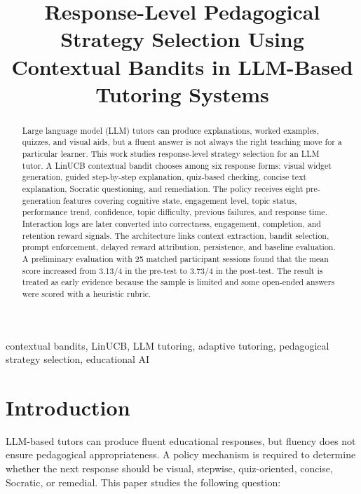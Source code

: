 \documentclass[conference]{IEEEtran}
\begin{document}
\title{Response-Level Pedagogical Strategy Selection Using
Contextual Bandits in LLM-Based Tutoring Systems}

\author{}

\maketitle

\begin{abstract}
Large language model (LLM) tutors can produce explanations, worked examples, quizzes, and visual aids, but a fluent answer is not always the right teaching move for a particular learner. This work studies response-level strategy selection for an LLM tutor. A LinUCB contextual bandit chooses among six response forms: visual widget generation, guided step-by-step explanation, quiz-based checking, concise text explanation, Socratic questioning, and remediation. The policy receives eight pre-generation features covering cognitive state, engagement level, topic status, performance trend, confidence, topic difficulty, previous failures, and response time. Interaction logs are later converted into correctness, engagement, completion, and retention reward signals. The architecture links context extraction, bandit selection, prompt enforcement, delayed reward attribution, persistence, and baseline evaluation. A preliminary evaluation with 25 matched participant sessions found that the mean score increased from 3.13/4 in the pre-test to 3.73/4 in the post-test. The result is treated as early evidence because the sample is limited and some open-ended answers were scored with a heuristic rubric.
\end{abstract}

\begin{IEEEkeywords}
contextual bandits, LinUCB, LLM tutoring, adaptive tutoring, pedagogical strategy selection, educational AI
\end{IEEEkeywords}

\section{Introduction}

LLM-based tutors can produce fluent educational responses, but fluency does not ensure pedagogical appropriateness. A policy mechanism is required to determine whether the next response should be visual, stepwise, quiz-oriented, concise, Socratic, or remedial. This paper studies the following question:
\end{document}
